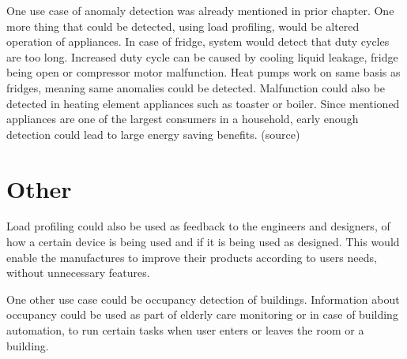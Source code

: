 \documentclass[
11pt, %
english, %
singlespacing, %
headsepline, %
]{MastersDoctoralThesis} %
\begin{document}
One use case of anomaly detection was already mentioned in prior chapter.
One more thing that could be detected, using load profiling, would be altered operation of appliances.
In case of fridge, system would detect that duty cycles are too long.
Increased duty cycle can be caused by cooling liquid leakage, fridge being open or compressor motor malfunction.
Heat pumps work on same basis as fridges, meaning same anomalies could be detected. 
Malfunction could also be detected in heating element appliances such as toaster or boiler. 
Since mentioned appliances are one of the largest consumers in a household, early enough detection could lead to large energy saving benefits. (source)

\section{Other}

Load profiling could also be used as feedback to the engineers and designers,
of how a certain device is being used and if it is being used as designed. 
This would enable the manufactures to improve their products according to 
users needs, without unnecessary features.

One other use case could be occupancy detection of buildings. Information about 
occupancy could be used as part of elderly care monitoring or in case of building
automation, to run certain tasks when user enters or leaves the room or a building.





% 


\printbibliography[heading=bibintoc]
\end{document}

